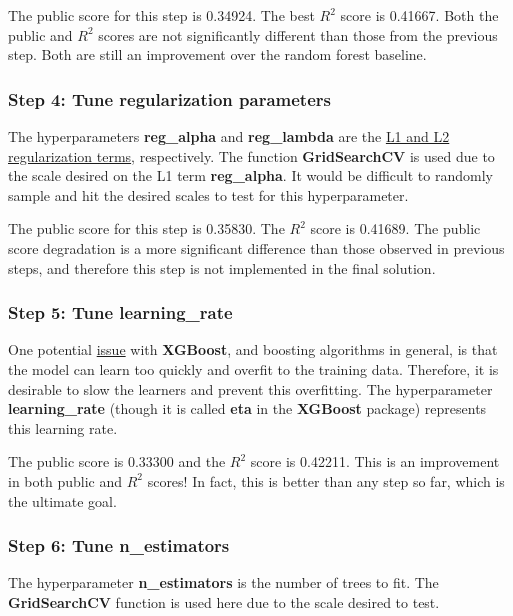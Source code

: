 \documentclass[12pt]{article}
\theoremstyle{plain} %
\theoremstyle{definition} %
\theoremstyle{remark} %
\begin{document}
\par The public score for this step is 0.34924.  The best $R^2$ score is 0.41667.  Both the public and $R^2$ scores are not significantly different than those from the previous step.  Both are still an improvement over the random forest baseline.

\subsubsection*{Step 4:  Tune regularization parameters}
\indent \par The hyperparameters \textbf{reg\_alpha} and \textbf{reg\_lambda} are the \href{http://cs.nyu.edu/~rostami/presentations/L1_vs_L2.pdf}{L1 and L2 regularization terms}, respectively. The function \textbf{GridSearchCV} is used due to the scale desired on the L1 term \textbf{reg\_alpha}. It would be difficult to randomly sample and hit the desired scales to test for this hyperparameter.

\par The public score for this step is 0.35830.  The $R^2$ score is 0.41689.  The public score degradation is a more significant difference than those observed in previous steps, and therefore this step is not implemented in the final solution.

\subsubsection*{Step 5:  Tune \textbf{learning\_rate}}
\indent \par One potential \href{http://machinelearningmastery.com/tune-learning-rate-for-gradient-boosting-with-xgboost-in-python/}{issue} with \textbf{XGBoost}, and boosting algorithms in general, is that the model can learn too quickly and overfit to the training data.  Therefore, it is desirable to slow the learners and prevent this overfitting.  The hyperparameter \textbf{learning\_rate} (though it is called \textbf{eta} in the \textbf{XGBoost} package) represents this learning rate.

\par The public score is 0.33300 and the $R^2$ score is 0.42211.  This is an improvement in both public and $R^2$ scores!  In fact, this is better than any step so far, which is the ultimate goal.

\subsubsection*{Step 6:  Tune \textbf{n\_estimators}}
\indent \par The hyperparameter \textbf{n\_estimators} is the number of trees to fit.  The \textbf{GridSearchCV} function is used here due to the scale desired to test.
\end{document}
